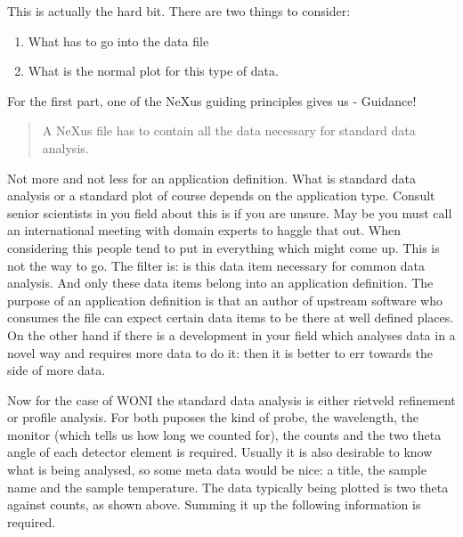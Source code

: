\documentclass[a4paper]{article}\usepackage[dvips]{graphicx}
\begin{document}
This is actually the hard bit. There are two things to consider:


\begin{enumerate}\item What has to go into the data file
\item What is the normal plot for this type of data.
\end{enumerate}For the first part, one of the NeXus guiding principles gives us - Guidance!


\begin{quote}

A NeXus file has to contain all the data necessary for standard data analysis.


\end{quote}

Not more and not less for an application definition. What is standard data analysis or a standard plot 
of course depends on the application type. Consult senior scientists in you field about this is if you are 
unsure. May be you must call an international meeting with domain experts to haggle that out. When considering 
this people tend to put in everything which might come up. This is not the way to go. The filter is: is this data 
item necessary for common data analysis. And only these data items belong into an application definition. The purpose 
of an application definition is that an author of upstream software who consumes the file can expect certain data items 
to be there at  well defined places. On the other hand if there is a development in your field which analyses data 
in a novel way and requires more data to do it: then it is better to err towards the side of more data. 


Now for the case of WONI the standard data analysis is either rietveld refinement or profile analysis. For both puposes 
the kind of probe,  the wavelength, the monitor (which tells us how long we counted for),
  the counts and the two theta angle of each detector element is required. Usually 
it is also desirable to know what is being analysed, so some meta data would be nice: a title, the sample name and the 
sample temperature. The data typically being plotted is two theta against counts, as shown above. Summing it up the 
following information is required.
\end{document}
